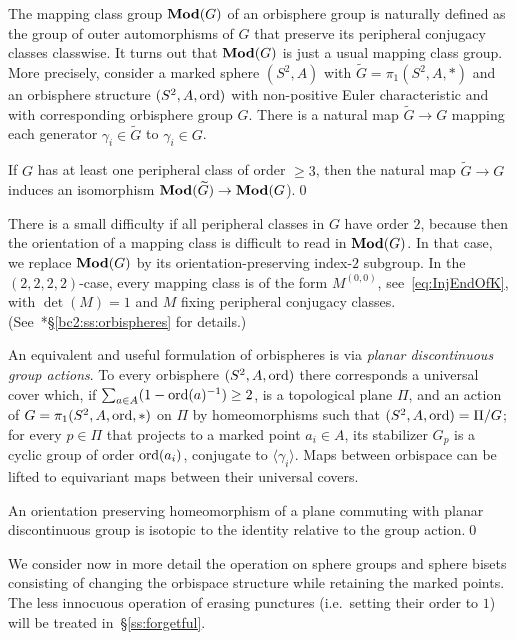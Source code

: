 \documentclass{amsart}
\begin{document}
The mapping class group $\mathbf{\relax Mod}(G)$ of an orbisphere group is naturally
defined as the group of outer automorphisms of $G$ that preserve its
peripheral conjugacy classes classwise. It turns out that $\mathbf{\relax Mod}(G)$ is
just a usual mapping class group. More precisely, consider a marked
sphere $(S^2,A)$ with $\widetilde G=\pi_1(S^2,A,*)$ and an orbisphere
structure $(S^2,A,\operatorname{ord})$ with non-positive Euler characteristic and
with corresponding orbisphere group $G$. There is a natural map
$\widetilde G\to G$ mapping each generator $\gamma_i\in\widetilde G$
to $\gamma_i\in G$.

\begin{thm}\label{thm:dehn-nielsen-baer}
  If $G$ has at least one peripheral class of order $\ge 3$, then the
  natural map $\widetilde G\to G$ induces an isomorphism
  $\mathbf{\relax Mod}(\widetilde G)\to\mathbf{\relax Mod}(G$).\qed
\end{thm}
There is a small difficulty if all peripheral classes in $G$ have
order $2$, because then the orientation of a mapping class is
difficult to read in $\mathbf{\relax Mod}(G)$. In that case, we replace $\mathbf{\relax Mod}(G)$ by
its orientation-preserving index-$2$ subgroup. In the
$(2,2,2,2)$-case, every mapping class is of the form $M^{(0,0)}$,
see~\eqref{eq:InjEndOfK}, with $\det(M)=1$ and $M$ fixing peripheral
conjugacy
classes. (See~\cite{bartholdi-dudko:bc2}*{\S\ref{bc2:ss:orbispheres}}
for details.)

An equivalent and useful formulation of orbispheres is via
\emph{planar discontinuous group actions}. To every orbisphere
$(S^2,A,\operatorname{ord})$ there corresponds a universal cover which, if
$\sum_{a\in A}(1-\operatorname{ord}(a)^{-1})\ge2$, is a topological plane $\Pi$, and
an action of $G=\pi_1(S^2,A,\operatorname{ord},*)$ on $\Pi$ by homeomorphisms such
that $(S^2,A,\operatorname{ord})=\Pi/G$; for every $p\in\Pi$ that projects to a
marked point $a_i\in A$, its stabilizer $G_p$ is a cyclic group of
order $\operatorname{ord}(a_i)$, conjugate to $\langle\gamma_i\rangle$. Maps between
orbispace can be lifted to equivariant maps between their universal covers.
\begin{thm}\label{thm:Baer}
  An orientation preserving homeomorphism of a plane commuting with
  planar discontinuous group is isotopic to the identity relative to
  the group action.\qed
\end{thm}

We consider now in more detail the operation on sphere groups and
sphere bisets consisting of changing the orbispace structure while
retaining the marked points. The less innocuous operation of erasing
punctures (i.e.\ setting their order to $1$) will be treated
in~\S\ref{ss:forgetful}.
\end{document}
